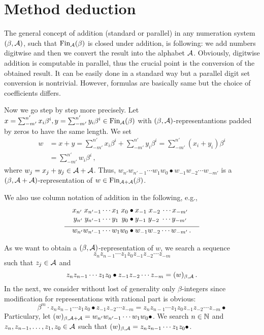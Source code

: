 \section{Method deduction}
The general concept of addition (standard or parallel) in any numeration system $(\beta,\mathcal{A})$, such that $\text{Fin}_{\mathcal{A}}(\beta)$ is closed under addition, is following: we add numbers digitwise and then we convert the result into the alphabet $\mathcal{A}$. Obviously, digitwise addition is computable in parallel, thus the crucial point is the conversion of the obtained result. It can be easily done in a standard way but a parallel digit set conversion is nontrivial. However, formulas are basically same but the choice of coefficients differs.

Now we go step by step more precisely. Let $x=\sum_{-m'}^{n'} x_i\beta^i,y=\sum_{-m'}^{n'} y_i\beta^i \in \text{Fin}_{\mathcal{A}}(\beta)$ with $(\beta,\mathcal{A})$-representantions padded by zeros to have the same length. We set 
  \begin{align*}
    w&=x+y =\sum_{-m'}^{n'} x_i\beta^i + \sum_{-m'}^{n'} y_i\beta^i = \sum_{-m'}^{n'} (x_i+y_i)\beta^i \\
    &=\sum_{-m'}^{n'} w_i\beta^i \,,
  \end{align*}
  where $w_j=x_j+y_j \in \mathcal{A} +\mathcal{A}$. Thus, $w_{n'} w_{{n'}-1}\cdots w_1 w_0 \bullet w_{-1} w_{-2} \cdots w_{-m'}$ is a  $(\beta, \mathcal{A}+\mathcal{A})$-representation of $w\in \text{Fin}_{\mathcal{A}+\mathcal{A}}(\beta)$. 

We also use column notation of addition in the following, e.g.,     
  \begin{align*}
  x_{n'} \;x_{{n'}-1}\cdots x_1 \;x_0 &\bullet x_{-1} \;x_{-2}\, \cdots x_{-m'} \\[-3pt]
  y_{n'} \;y_{{n'}-1}\cdots y_1 \,\;y_0 &\bullet y_{-1} \;y_{-2} \;\cdots y_{-m'} \\[-7pt]
    \line(1,0){90} & \line(1,0){100} \\[-7pt]
  w_{n'} w_{{n'}-1}\cdots w_1 w_0 &\bullet w_{-1} w_{-2} \cdots w_{-m'}\,.
  \end{align*}
  
As we want to obtain a $(\beta,\mathcal{A})$-representation of $w$, we search a sequence 
  $$z_{n} z_{n-1}\cdots z_1 z_0 z_{-1} z_{-2} \cdots z_{-m}$$ such that $z_j \in \mathcal{A}$ and
  $$
    z_{n} z_{n-1}\cdots z_1 z_0 \bullet z_{-1} z_{-2} \cdots z_{-m}=(w)_{\beta,\mathcal{A}}\,.
  $$
  In the next, we consider without lost of generality only $\beta$-integers since modification for representations with rational part is obvious:
  $$
  \beta^m \cdot z_{n} z_{n-1}\cdots z_1 z_0 \bullet z_{-1} z_{-2} \cdots z_{-m} = z_{n} z_{n-1}\cdots z_1 z_0 z_{-1} z_{-2} \cdots z_{-m} \bullet
  $$  
  Particulary, let $(w)_{\beta, \mathcal{A}+\mathcal{A}}=w_{n'} w_{{n'}-1}\cdots w_1 w_0 \bullet$. We search $n \in \mathbb{N}$ and $z_{n}, z_{n-1},\dots, z_1, z_0 \in \mathcal{A}$ such that $(w)_{\beta, \mathcal{A}}=z_{n} z_{n-1}\cdots z_1 z_0 \bullet$.   
  
